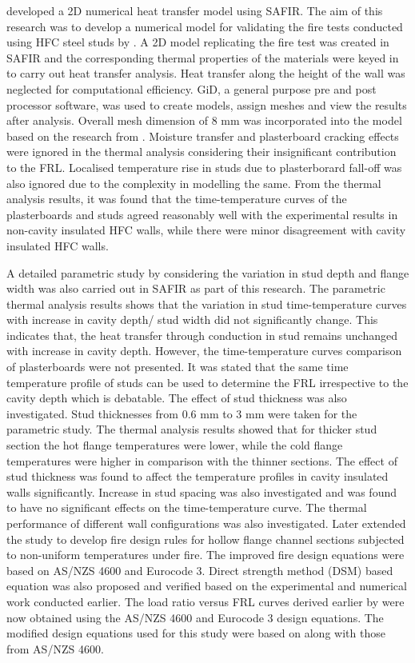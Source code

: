 \citet{Kesawan2015a} developed a 2D numerical heat transfer model using SAFIR. The aim of this research was to develop a numerical model for validating the fire tests conducted using HFC steel studs by \citet{Kesawan2015}. A 2D model replicating the fire test was created in SAFIR and the corresponding thermal properties of the materials were keyed in to carry out heat transfer analysis. Heat transfer along the height of the wall was neglected for computational efficiency. GiD, a general purpose pre and post processor software, was used to create models, assign meshes and view the results after analysis. Overall mesh dimension of 8 mm was incorporated into the model based on the research from \citet{Keerthan2012}. Moisture transfer and plasterboard cracking effects were ignored in the thermal analysis considering their insignificant contribution to the FRL. Localised temperature rise in studs due to plasterborard fall-off was also ignored due to the complexity in modelling the same. From the thermal analysis results, it was found that the time-temperature curves of the plasterboards and studs agreed reasonably well with the experimental results in non-cavity insulated HFC walls, while there were minor disagreement with cavity insulated HFC walls. 

A detailed parametric study by considering the variation in stud depth and flange width was also carried out in SAFIR as part of this research. The parametric thermal analysis results shows that the variation in stud time-temperature curves with increase in cavity depth/ stud width did not significantly change. This indicates that, the heat transfer through conduction in stud remains unchanged with increase in cavity depth. However, the time-temperature curves comparison of plasterboards were not presented. It was stated that the same time temperature profile of studs can be used to determine the FRL irrespective to the cavity depth which is debatable. The effect of stud thickness was also investigated. Stud thicknesses from 0.6 mm to 3 mm were taken for the parametric study. The thermal analysis results showed that for thicker stud section the hot flange temperatures were lower, while the cold flange temperatures were higher in comparison with the thinner sections. The effect of stud thickness was found to affect the temperature profiles in cavity insulated walls significantly. Increase in stud spacing was also investigated and was found to have no significant effects on the time-temperature curve. The thermal performance of different wall configurations was also investigated. Later \citet{Kesawan2016} extended the study to develop fire design rules for hollow flange channel sections subjected to non-uniform temperatures under fire. The improved fire design equations were based on AS/NZS 4600 and Eurocode 3. Direct strength method (DSM) based equation was also proposed and verified based on the experimental and numerical work conducted earlier. The load ratio versus FRL curves derived earlier by \citet{Kesawan2015a} were now obtained using the AS/NZS 4600 and Eurocode 3 design equations. The modified design equations used for this study were based on \citet{Gunalan2013a} along with those from AS/NZS 4600.  

